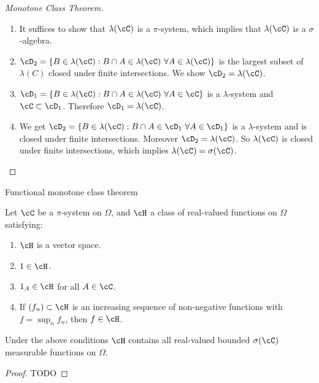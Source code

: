 \begin{frame}
    
    \begin{proof}[Monotone Class Theorem]
        \begin{enumerate}
            \item It suffices to show that $\lambda(\cC)$ is a $\pi$-system, which implies that 
                $\lambda(\cC)$ is a $\sigma$-algebra.

            \item $\cD_2 = \left\{ B \in\lambda(\cC) : B \cap A \in
                \lambda(\cC) \ \forall A \in \lambda (\cC) \right\}$ is the
                largest subset of $\lambda(C)$ closed under finite
                intersections. We show $\cD_2 = \lambda(\cC)$. 

            \item $\cD_1 = \left\{ B \in\lambda(\cC) : B \cap A \in
                \lambda(\cC) \ \forall A \in \cC \right\}$ is a
                $\lambda$-system and $\cC \subset \cD_1$.  Therefore $\cD_1 =
                \lambda(\cC)$.

            \item We get $\cD_2 = \left\{ B \in\lambda(\cC) : B \cap A \in
                \cD_1 \ \forall A \in \cD_1 \right\}$ is a $\lambda$-system and is
                closed under finite intersections. Moreover $\cD_2 = \lambda(\cC)$.
                So $\lambda(\cC)$ is closed under finite intersections, which
                implies $\lambda(\cC) = \sigma(\cC)$.
        \end{enumerate}
    \end{proof}
\end{frame}


\begin{frame}
    {Functional monotone class theorem}
    
    \begin{theorem}
        Let $\cC$ be a $\pi$-system on $\Omega$, and $\cH$ a class of real-valued
        functions on $\Omega$ satisfying:
        \begin{enumerate}
            \item $\cH$ is a vector space.
            \item $1\in\cH$.
            \item $1_{A}\in\cH$ for all $A\in\cC$.
            \item If $\left( f_n \right) \subset \cH$ is an increasing sequence of non-negative
                functions with $f = \sup_{n} f_n$, then $f\in\cH$.
        \end{enumerate}
        Under the above conditions $\cH$ contains all real-valued bounded $\sigma(\cC)$
        measurable functions on $\Omega$.
    \end{theorem}

    \begin{proof}
        TODO
    \end{proof}
\end{frame}


